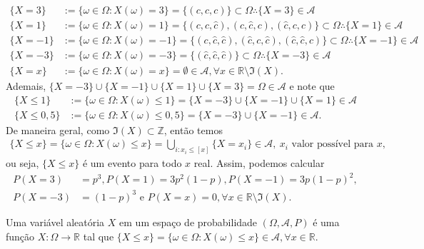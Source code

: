 \documentclass[../Notas.tex]{subfiles}
\begin{document}
\begin{align*}
    \{X=3\} &:= \{\omega\in\Omega : X(\omega) = 3\} = \{(c,c,c)\} \subset\Omega \therefore \{X=3\}\in\mathcal{A} \\
    \{X=1\} &:= \{\omega\in\Omega : X(\omega) = 1\} = \{(c,c,\widehat{c}), (c,\widehat{c},c), (\widehat{c}, c, c)\} \subset\Omega \therefore \{X=1\}\in\mathcal{A} \\
    \{X=-1\} &:= \{\omega\in\Omega : X(\omega) = -1\} = \{(c,\widehat{c},\widehat{c}), (\widehat{c},c,\widehat{c}), (\widehat{c}, \widehat{c}, c)\} \subset\Omega \therefore \{X=-1\}\in\mathcal{A} \\
    \{X=-3\} &:= \{\omega\in\Omega : X(\omega) = -3\} = \{(\widehat{c}, \widehat{c}, \widehat{c})\} \subset\Omega \therefore \{X=-3\}\in\mathcal{A} \\
    \{X=x\} &:= \{\omega\in\Omega : X(\omega) = x\} = \emptyset\in\mathcal{A}, \forall x\in\mathbb{R}\setminus\Im(X).
\end{align*}
Ademais, $\{X=-3\}\cup\{X=-1\}\cup\{X=1\}\cup\{X=3\} = \Omega\in\mathcal{A}$ e note que
\begin{align*}
    \{X\leq 1\} &:= \{\omega\in\Omega : X(\omega) \leq 1\} = \{X=-3\}\cup\{X=-1\}\cup\{X=1\} \in\mathcal{A} \\
    \{X\leq 0,5\} &:= \{\omega\in\Omega : X(\omega) \leq 0,5\} = \{X=-3\}\cup\{X=-1\} \in\mathcal{A}.
\end{align*}
De maneira geral, como $\Im(X)\subset\mathbb{Z}$, então temos
\begin{align*}
    \{ X\leq x \} = \{ \omega\in\Omega : X(\omega) \leq x \} = \bigcup_{i: x_i\leq[x]}\{X = x_i\}\in\mathcal{A}, \ x_i \text{ valor possível para }x,
\end{align*}
ou seja, $\{X\leq x\}$ é um evento para todo $x$ real. Assim, podemos calcular
\begin{align*}
    P(X=3) &= p^3, P(X=1) = 3p^2(1-p), P(X=-1) = 3p(1-p)^2, \\
    P(X=-3) &= (1-p)^3 \text{ e } P(X=x) = 0, \forall x\in\mathbb{R}\setminus\Im(X).
\end{align*}

\begin{definition}
Uma variável aleatória $X$ em um espaço de probabilidade $(\Omega, \mathcal{A}, P)$ é uma função $X:\Omega\to\mathbb{R}$ tal que $\{X\leq x\} = \{ \omega\in\Omega : X(\omega)\leq x\}\in\mathcal{A}, \forall x\in\mathbb{R}$.
\end{definition}
\end{document}

